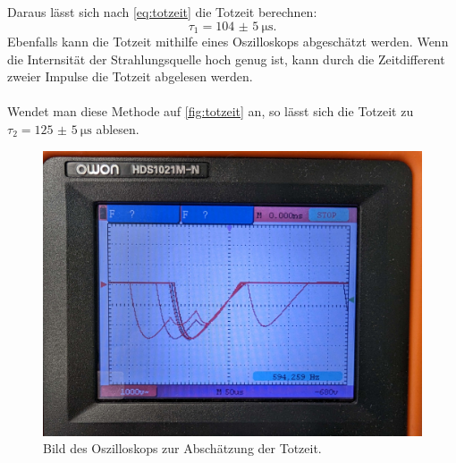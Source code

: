 Daraus lässt sich nach \autoref{eq:totzeit} die Totzeit berechnen:
\begin{equation*}
  \tau_1 = \SI{104(5)}{\micro\s}.
\end{equation*}
Ebenfalls kann die Totzeit mithilfe eines Oszilloskops abgeschätzt werden. Wenn die Internsität der Strahlungsquelle hoch genug ist,
kann durch die Zeitdifferent zweier Impulse die Totzeit abgelesen werden.
\\
\\
Wendet man diese Methode auf \autoref{fig:totzeit} an, so lässt sich die Totzeit zu $\tau_2 = \SI{125(5)}{\micro\s}$ ablesen.
\begin{figure}[H]
  \includegraphics[width=\textwidth]{content/oszilloskop.jpg}
  \caption{Bild des Oszilloskops zur Abschätzung der Totzeit.}
  \label{fig:totzeit}
\end{figure}